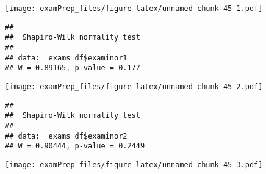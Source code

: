 \documentclass[
]{article}
\newenvironment{Shaded}{\begin{snugshade}}{\end{snugshade}}
\newcommand{\FunctionTok}[1]{\textcolor[rgb]{0.00,0.00,0.00}{#1}}
\newcommand{\NormalTok}[1]{#1}
\newcommand{\SpecialCharTok}[1]{\textcolor[rgb]{0.00,0.00,0.00}{#1}}
\begin{document}
\texttt{[image: examPrep\_files/figure-latex/unnamed-chunk-45-1.pdf]}

\begin{Shaded}
\end{Shaded}

\begin{verbatim}
## 
##  Shapiro-Wilk normality test
## 
## data:  exams_df$examinor1
## W = 0.89165, p-value = 0.177
\end{verbatim}

\begin{Shaded}
\end{Shaded}

\texttt{[image: examPrep\_files/figure-latex/unnamed-chunk-45-2.pdf]}

\begin{Shaded}
\end{Shaded}

\begin{verbatim}
## 
##  Shapiro-Wilk normality test
## 
## data:  exams_df$examinor2
## W = 0.90444, p-value = 0.2449
\end{verbatim}

\begin{Shaded}
\end{Shaded}

\texttt{[image: examPrep\_files/figure-latex/unnamed-chunk-45-3.pdf]}

\begin{Shaded}
\end{Shaded}
\end{document}
